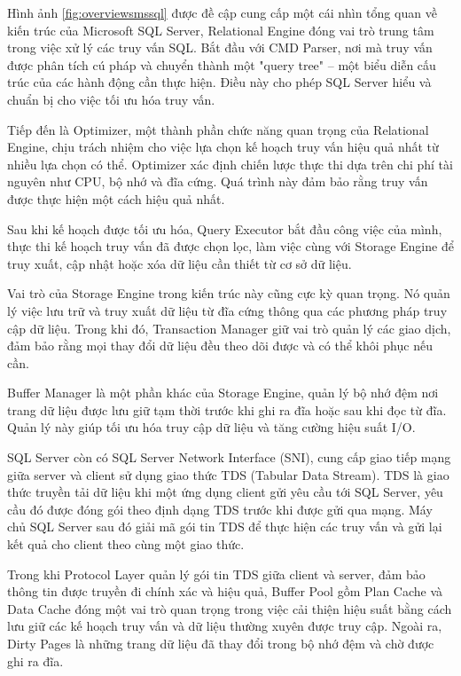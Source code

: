 \documentclass{article}[14pt]
\begin{document}
{Hình ảnh \ref{fig:overviewsmssql} được đề cập cung cấp một cái nhìn tổng quan về
kiến trúc của Microsoft SQL Server, Relational Engine đóng vai trò trung tâm trong việc xử lý các truy vấn SQL. Bắt đầu với CMD Parser, nơi mà truy vấn được phân tích cú pháp và chuyển thành một "query tree" – một biểu diễn cấu trúc của các hành động cần thực hiện. Điều này cho phép SQL Server hiểu và chuẩn bị cho việc tối ưu hóa truy vấn.

Tiếp đến là Optimizer, một thành phần chức năng quan trọng của Relational Engine, chịu trách nhiệm cho việc lựa chọn kế hoạch truy vấn hiệu quả nhất từ nhiều lựa chọn có thể. Optimizer xác định chiến lược thực thi dựa trên chi phí tài nguyên như CPU, bộ nhớ và đĩa cứng. Quá trình này đảm bảo rằng truy vấn được thực hiện một cách hiệu quả nhất.

Sau khi kế hoạch được tối ưu hóa, Query Executor bắt đầu công việc của mình, thực thi kế hoạch truy vấn đã được chọn lọc, làm việc cùng với Storage Engine để truy xuất, cập nhật hoặc xóa dữ liệu cần thiết từ cơ sở dữ liệu.

Vai trò của Storage Engine trong kiến trúc này cũng cực kỳ quan trọng. Nó quản lý việc lưu trữ và truy xuất dữ liệu từ đĩa cứng thông qua các phương pháp truy cập dữ liệu. Trong khi đó, Transaction Manager giữ vai trò quản lý các giao dịch, đảm bảo rằng mọi thay đổi dữ liệu đều theo dõi được và có thể khôi phục nếu cần.

Buffer Manager là một phần khác của Storage Engine, quản lý bộ nhớ đệm nơi trang dữ liệu được lưu giữ tạm thời trước khi ghi ra đĩa hoặc sau khi đọc từ đĩa. Quản lý này giúp tối ưu hóa truy cập dữ liệu và tăng cường hiệu suất I/O.

SQL Server còn có SQL Server Network Interface (SNI), cung cấp giao tiếp mạng giữa server và client sử dụng giao thức TDS (Tabular Data Stream). TDS là giao thức truyền tải dữ liệu khi một ứng dụng client gửi yêu cầu tới SQL Server, yêu cầu đó được đóng gói theo định dạng TDS trước khi được gửi qua mạng. Máy chủ SQL Server sau đó giải mã gói tin TDS để thực hiện các truy vấn và gửi lại kết quả cho client theo cùng một giao thức.

Trong khi Protocol Layer quản lý gói tin TDS giữa client và server, đảm bảo thông tin được truyền đi chính xác và hiệu quả, Buffer Pool gồm Plan Cache và Data Cache đóng một vai trò quan trọng trong việc cải thiện hiệu suất bằng cách lưu giữ các kế hoạch truy vấn và dữ liệu thường xuyên được truy cập. Ngoài ra, Dirty Pages là những trang dữ liệu đã thay đổi trong bộ nhớ đệm và chờ được ghi ra đĩa.

}
\end{document}
